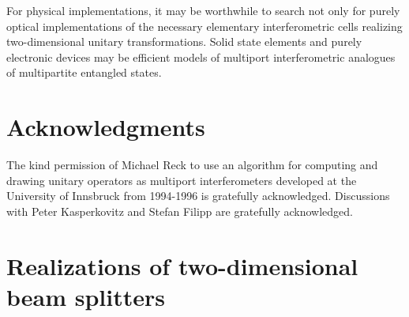 \documentclass[12pt]{iopart}
\begin{document}
For physical implementations,
it may be worthwhile to search not only for  purely  optical implementations
of the necessary elementary
interferometric cells realizing two-dimensional unitary transformations.
Solid state elements and purely electronic devices
may be efficient models of multiport interferometric analogues of multipartite
entangled states.

\section*{Acknowledgments}
The kind permission of Michael Reck to
use an algorithm for computing and drawing
unitary operators as multiport interferometers
developed at the University of Innsbruck from 1994-1996 is gratefully acknowledged.
Discussions with Peter Kasperkovitz and Stefan Filipp are gratefully acknowledged.


\appendix


\section{Realizations of two-dimensional beam splitters}
\label{2004-analog-appendixA}
\end{document}
